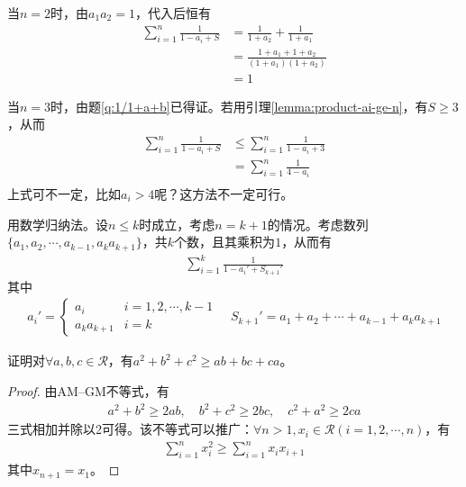 当$n=2$时，由$a_1a_2=1$，代入后恒有
\begin{align*}
  \sum_{i=1}^n \frac{1}{1 - a_i + S} &= \frac{1}{1+a_2} + \frac1{1+a_1}\\
                                     &= \frac{1+a_1 + 1 + a_2}{(1+a_1)(1+a_2)}\\
                                     &=1
\end{align*}

当$n=3$时，由题\ref{q:1/1+a+b}已得证。若用引理\ref{lemma:product-ai-ge-n}，有$S\ge 3$，从而
\begin{align*}
  \sum_{i=1}^n \frac{1}{1 - a_i + S} &\le \sum_{i=1}^n \frac{1}{1 - a_i + 3}\\
                                     &=   \sum_{i=1}^n \frac{1}{4 - a_i}\\
\end{align*}
{\color{red}上式可不一定，比如$a_i>4$呢？这方法不一定可行。}

用数学归纳法。设$n\le k$时成立，考虑$n=k+1$的情况。考虑数列$\{a_1,a_2,\cdots, a_{k-1}, a_ka_{k+1}\}$，共$k$个数，且其乘积为$1$，从而有
\begin{align*}
  \sum_{i=1}^{k} \frac{1}{1 - a_i' + S_{k+1}'}
\end{align*}
其中
\begin{align*}
  a_i'=
  \begin{cases}
    a_i &i=1,2,\cdots,k-1\\
    a_ka_{k+1} &i=k
  \end{cases} \quad
  S_{k+1}'= a_1+a_2+\cdots +a_{k-1} + a_ka_{k+1}
\end{align*}

\begin{example}
  证明对$\forall a,b,c\in\mathcal{R}$，有$a^2+b^2+c^2\ge ab+bc+ca$。
\end{example}
\begin{proof}
  由AM--GM不等式，有
\begin{align*}
  a^2+b^2\ge 2ab,\quad b^2+c^2\ge 2bc,\quad c^2+a^2\ge 2ca
\end{align*}
三式相加并除以2可得。该不等式可以推广：$\forall n>1, x_i\in\mathcal{R}(i=1,2,\cdots,n)$，有
\begin{align*}
  \sum_{i=1}^n x_i^2\ge \sum_{i=1}^n x_ix_{i+1}
\end{align*}
其中$x_{n+1}=x_1$。
\end{proof}

